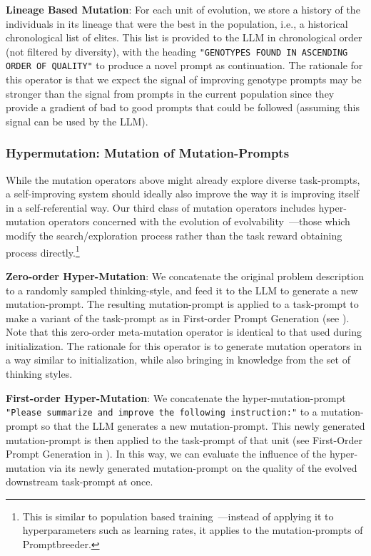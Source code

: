 \documentclass{article} %
\newcommand{\prompt}[1]{\footnotesize{\texttt{"#1"}}\normalsize}
\begin{document}
\textbf{Lineage Based Mutation}: For each unit of evolution, we store a history of the individuals in its lineage that were the best in the population, i.e., a historical chronological list of elites. This list is provided to the LLM in chronological order (not filtered by diversity), with the heading \prompt{GENOTYPES FOUND IN ASCENDING ORDER OF QUALITY} to produce a novel prompt as continuation. The rationale for this operator is that we expect the signal of improving genotype prompts may be stronger than the signal from prompts in the current population since they provide a gradient of bad to good prompts that could be followed (assuming this signal can be used by the LLM).  

\subsubsection{Hypermutation: Mutation of Mutation-Prompts}
While the mutation operators above might already explore diverse task-prompts, a self-improving system should ideally also improve the way it is improving itself in a self-referential way. Our third class of mutation operators includes hyper-mutation operators concerned with the evolution of evolvability~\citep{dawkins200313,pigliucci2008evolvability,payne2019causes,DBLP:conf/gecco/GajewskiCSL19}---those which modify the search/exploration process rather than the task reward obtaining process directly.\footnote{This is similar to population based training~\citep{DBLP:journals/corr/abs-1711-09846}---instead of applying it to hyperparameters such as learning rates, it applies to the mutation-prompts of Promptbreeder.}

\textbf{Zero-order Hyper-Mutation}: We concatenate the original problem description to a randomly sampled thinking-style, and feed it to the LLM to generate a new mutation-prompt. The resulting mutation-prompt is applied to a task-prompt to make a variant of the task-prompt as in First-order Prompt Generation (see ). Note that this zero-order meta-mutation operator is identical to that used during initialization. The rationale for this operator is to generate mutation operators in a way similar to initialization, while also bringing in knowledge from the set of thinking styles. 

\textbf{First-order Hyper-Mutation}: We concatenate the hyper-mutation-prompt \prompt{Please summarize and improve the following instruction:} to a  mutation-prompt so that the LLM generates a new mutation-prompt. This newly generated mutation-prompt is then applied to the task-prompt of that unit (see First-Order Prompt Generation in ). In this way, we can evaluate the influence of the hyper-mutation via its newly generated mutation-prompt on the quality of the evolved downstream task-prompt at once.
\end{document}
